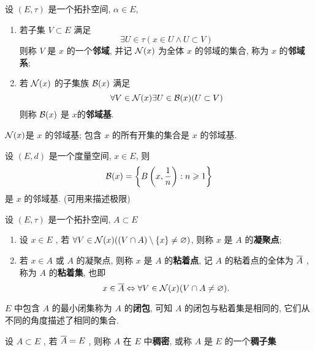 	\begin{Definition}[邻域基]\label{def:邻域基}
	   设 $ (E, \tau) $ 是一个拓扑空间, $ \alpha\in E $,
	   \begin{enumerate}[(1)]
		  \item 若子集 $ V\subset E $ 满足
		  \[
			 \exists U\in \tau(x\in U\land U\subset V)
		  \]
		  则称 $ V $ 是 $ x $ 的一个\textbf{邻域}, 并记 $ \CN(x) $ 为全体 $ x $ 的邻域的集合, 称为 $ x $ 的\textbf{邻域系};
		  \item 若 $ \CN(x) $ 的子集族 $ \CB(x) $ 满足
		  \[
			 \forall V\in \CN(x)\exists U\in \CB(x)(U\subset V)
		  \]
		  则称 $ \CB(x) $ 是 $ x $的\textbf{邻域基}.
	   \end{enumerate}
	\end{Definition}
	\begin{Remark}
	   $ \CN(x) $是 $ x $  的邻域基; 包含 $ x $ 的所有开集的集合是 $ x $ 的邻域基.
	\end{Remark}
	\begin{Example}
	   设 $ (E, d) $ 是一个度量空间, $ x\in E $, 则
	   \[
		  \CB(x)=\left\{ B\left(x,\frac{1}{n}\right): n\geqslant 1 \right\}
	   \]
	   是 $ x $ 的邻域基. (可用来描述极限)
	\end{Example}
	\begin{Definition}[粘着集]
	   设 $ (E, \tau) $ 是一个拓扑空间, $ A\subset E $
	   \begin{enumerate}[(1)]
		  \item 设 $ x\in E $ , 若 $ \forall V\in \CN(x)((V\cap A)\sm \{ x \}\neq\varnothing) $, 则称 $ x $ 是 $ A $ 的\textbf{凝聚点};
		  \item 若 $ x\in A $ 或 $ A $  的凝聚点, 则称 $ x $ 是 $ A $ 的\textbf{粘着点}, 记 $ A $ 的粘着点的全体为 $ \baro{A} $ , 称为 $ A $ 的\textbf{粘着集}, 也即
		  \[
			 x\in \baro{A}\Leftrightarrow \forall V\in \CN(x)(V\cap A\neq\varnothing).
	   	\]
	   \end{enumerate}
	\end{Definition}
	\begin{Remark}
	   $ E $ 中包含 $ A $ 的最小闭集称为 $ A $ 的\textbf{闭包}, 可知 $ A $ 的闭包与粘着集是相同的, 它们从不同的角度描述了相同的集合.
	\end{Remark}
	\begin{Definition}[稠密]\label{def:稠密}
	   设 $ A\subset E $ , 若 $ \baro{A}=E $ , 则称 $ A $ 在 $ E $ 中\textbf{稠密}, 或称 $ A $ 是 $ E $ 的一个\textbf{稠子集}
	\end{Definition}
